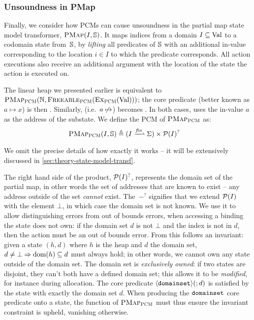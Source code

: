 \subsubsection{Unsoundness in PMap}

Finally, we consider how PCMs can cause unsoundness in the partial map state model transformer, $\textsc{PMap}(I, \mathbb S)$. It maps indices from a domain $I\subseteq\text{Val}$ to a codomain state from~$\mathbb S$, by \emph{lifting} all predicates of $\mathbb S$ with an additional in-value corresponding to the location $i\in I$ to which the predicate corresponds. All action executions also receive an additional argument with the location of the state the action is executed on.

The linear heap we presented earlier is equivalent to $\textsc{PMap}_{\textsc{PCM}}(\mathbb N, \textsc{Freeable}_{\textsc{PCM}}(\textsc{Ex}_{\textsc{PCM}}(\text{Val})))$; the core predicate  (better known as $a\mapsto x$) is then . Similarly,  (i.e.~$a\not\mapsto$) becomes . In both cases, \PMap{} uses the in-value $a$ as the address of the substate. We define the PCM of $\textsc{PMap}_{\textsc{PCM}}$ as: \begin{align*}
	\PMap_\PCM(I, \mmdl) &\defeq (I \finmap \St) \times \pset(I)^?
\end{align*}

We omit the precise details of how exactly it works -- it will be extensively discussed in \cref{sec:theory-state-model-transf}. 

The right hand side of the product, ${\cal P}(I)^?$, represents the domain set of the partial map, in other words the set of addresses that are known to exist -- any address outside of the set \emph{cannot} exist. The~$-^?$ signifies that we extend ${\cal P}(I)$ with the element $\bot$, in which case the domain set is not known. We use it to allow distinguishing \Miss{} errors from out of bounds errors, when accessing a binding the state does not own: if the domain set $d$ is not $\bot$ and the index is not in $d$, then the action must be an out of bounds error. From this follows an invariant: given a state $(h,d)$ where $h$ is the heap and $d$ the domain set, $d\neq\bot\Rightarrow\operatorname{dom}(h)\subseteq d$ must always hold; in other words, we cannot own any state outside of the domain set. The domain set is \emph{exclusively owned}: if two \PMap{} states are disjoint, they can't both have a defined domain set; this allows it to be \emph{modified}, for instance during allocation. The core predicate $\left<\texttt{domainset}\right>\!(;d)$ is satisfied by the state with exactly the domain set $d$. When producing the $\texttt{domainset}$ core predicate onto a state, the \produce{} function of $\textsc{PMap}_{\textsc{PCM}}$ must thus ensure the invariant constraint is upheld, vanishing otherwise.

